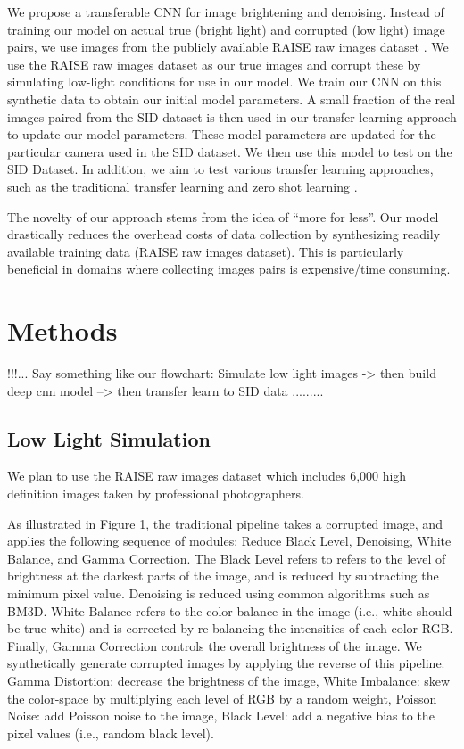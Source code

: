 \documentclass{article}
\begin{document}
We propose a transferable CNN for image brightening and denoising. Instead
of training our model on actual true (bright light) and corrupted
(low light) image pairs, we use images from the publicly available
RAISE raw images dataset \cite{Dang-Nguyen:2015:RRI:2713168.2713194}. We
use the RAISE raw images dataset as our true images and corrupt these by
simulating low-light conditions for use in our model. We train our CNN on
this synthetic
data to obtain our initial model parameters. A small fraction of the real
images paired from the SID dataset is then used in our transfer learning
\cite{Goodfellow-et-al-2016} approach to update our model parameters.
These model parameters are updated for the particular camera used in the
SID dataset. We then use this model to test on the SID Dataset. In
addition, we aim to test various transfer learning approaches, such as the
traditional transfer learning and zero shot learning \cite{larochelle2008, NIPS2009_3650,socher2013zeroshot}. \newline

The novelty of our approach stems from the idea of ``more for less''. Our
model drastically reduces the overhead costs of data collection by
synthesizing readily available training data (RAISE raw images dataset).
This is
particularly beneficial in domains where collecting images pairs is
expensive/time consuming.

\section{Methods}

!!!... Say something like our flowchart: 
Simulate low light images -> then build deep cnn model --> then transfer learn to SID data .........


\subsection{Low Light Simulation}

We plan to use the RAISE raw images dataset which includes 6,000 high
definition images taken by professional photographers.

As illustrated in Figure 1, the traditional pipeline takes a corrupted image, and applies the following sequence of modules: Reduce Black Level, Denoising, White Balance, and Gamma Correction. The Black Level refers to refers to the level of brightness at the darkest parts of the image, and is reduced by subtracting the minimum pixel value. Denoising is reduced using common algorithms such as BM3D. White Balance refers to the color balance in the image (i.e., white should be true white) and is corrected by re-balancing the intensities of each color RGB. Finally, Gamma Correction controls the overall brightness of the image. We synthetically generate corrupted images by applying the reverse of this pipeline. Gamma Distortion: decrease the brightness of the image, White Imbalance: skew the color-space by multiplying each level of RGB by a random weight, Poisson Noise: add Poisson noise to the image, Black Level: add a negative bias to the pixel values (i.e., random black level). 
\end{document}

